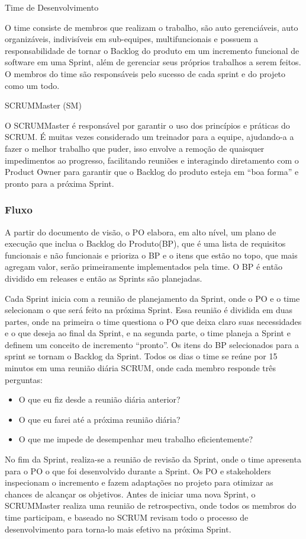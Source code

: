 Time de Desenvolvimento

O time consiste de membros que realizam o trabalho, são auto gerenciáveis, auto organizáveis, indivisíveis em sub-equipes, multifuncionais e possuem a responsabilidade de tornar o Backlog do produto em um incremento funcional de software em uma Sprint, além de gerenciar seus próprios trabalhos a serem feitos. O membros do time são responsáveis pelo sucesso de cada sprint e do projeto como um todo. \cite{schwaber2004}

SCRUMMaster (SM)

O SCRUMMaster é responsável por garantir o uso dos princípios e práticas do SCRUM. É muitas vezes considerado um treinador para a equipe, ajudando-a a fazer o melhor trabalho que puder, isso envolve a remoção de quaisquer impedimentos ao progresso, facilitando reuniões e interagindo diretamento com o Product Owner para garantir que o Backlog do produto esteja em “boa forma” e pronto para a próxima Sprint. \cite{schwaber2004}

\subsubsection{Fluxo}
A partir do documento de visão, o PO elabora, em alto nível, um plano de execução que inclua o Backlog do Produto(BP), que é uma lista de requisitos funcionais e não funcionais e prioriza o BP e o itens que estão no topo, que mais agregam valor, serão primeiramente implementados pela time. O BP é então dividido em releases e então as Sprints são planejadas.\cite{schwaber2004}

Cada Sprint inicia com a reunião de planejamento da Sprint, onde o PO e o time selecionam o que será feito na próxima Sprint. Essa reunião é dividida em duas partes, onde na primeira o time questiona o PO que deixa claro suas necessidades e o que deseja ao final da Sprint, e na segunda parte, o time planeja a Sprint e definem um conceito de incremento “pronto”. Os itens do BP selecionados para a sprint se tornam o Backlog da Sprint. Todos os dias o time se reúne por 15 minutos em uma reunião diária SCRUM, onde cada membro responde três perguntas:
\begin{itemize}
	\item O que eu fiz desde a reunião diária anterior? \cite{keith2010}
	\item O que eu farei até a próxima reunião diária? \cite{keith2010}
	\item O que me impede de desempenhar meu trabalho eficientemente? \cite{schwaber2004}
 \end{itemize} 

No fim da Sprint, realiza-se a reunião de revisão da Sprint, onde o time apresenta para o PO o que foi desenvolvido durante a Sprint. Os PO e stakeholders inspecionam o incremento e fazem adaptações no projeto para otimizar as chances de alcançar os objetivos. Antes de iniciar uma nova Sprint, o SCRUMMaster realiza uma reunião de retrospectiva, onde todos os membros do time participam, e baseado no SCRUM revisam todo o processo de desenvolvimento para torna-lo mais efetivo na próxima Sprint.\cite{schwaber2004}





